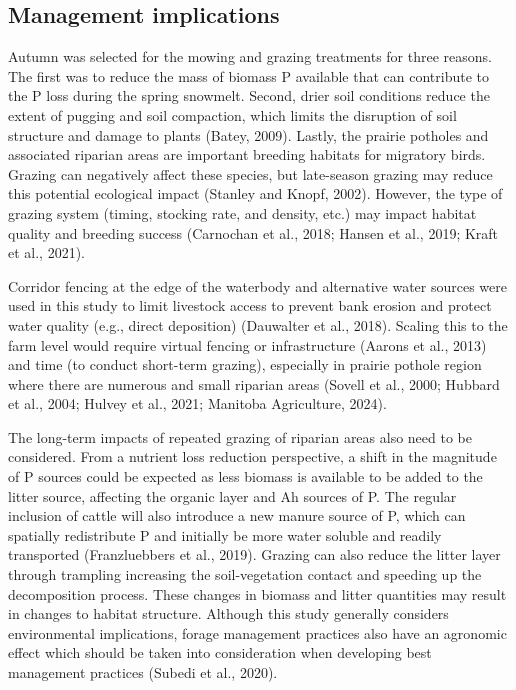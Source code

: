 \documentclass[
]{agujournal2019}
\begin{document}
\subsection{Management implications}\label{management-implications}

Autumn was selected for the mowing and grazing treatments for three
reasons. The first was to reduce the mass of biomass P available that
can contribute to the P loss during the spring snowmelt. Second, drier
soil conditions reduce the extent of pugging and soil compaction, which
limits the disruption of soil structure and damage to plants (Batey,
2009). Lastly, the prairie potholes and associated riparian areas are
important breeding habitats for migratory birds. Grazing can negatively
affect these species, but late-season grazing may reduce this potential
ecological impact (Stanley and Knopf, 2002). However, the type of
grazing system (timing, stocking rate, and density, etc.) may impact
habitat quality and breeding success (Carnochan et al., 2018; Hansen et
al., 2019; Kraft et al., 2021).

Corridor fencing at the edge of the waterbody and alternative water
sources were used in this study to limit livestock access to prevent
bank erosion and protect water quality (e.g., direct deposition)
(Dauwalter et al., 2018). Scaling this to the farm level would require
virtual fencing or infrastructure (Aarons et al., 2013) and time (to
conduct short-term grazing), especially in prairie pothole region where
there are numerous and small riparian areas (Sovell et al., 2000;
Hubbard et al., 2004; Hulvey et al., 2021; Manitoba Agriculture, 2024).

The long-term impacts of repeated grazing of riparian areas also need to
be considered. From a nutrient loss reduction perspective, a shift in
the magnitude of P sources could be expected as less biomass is
available to be added to the litter source, affecting the organic layer
and Ah sources of P. The regular inclusion of cattle will also introduce
a new manure source of P, which can spatially redistribute P and
initially be more water soluble and readily transported (Franzluebbers
et al., 2019). Grazing can also reduce the litter layer through
trampling increasing the soil-vegetation contact and speeding up the
decomposition process. These changes in biomass and litter quantities
may result in changes to habitat structure. Although this study
generally considers environmental implications, forage management
practices also have an agronomic effect which should be taken into
consideration when developing best management practices (Subedi et al.,
2020).
\end{document}
